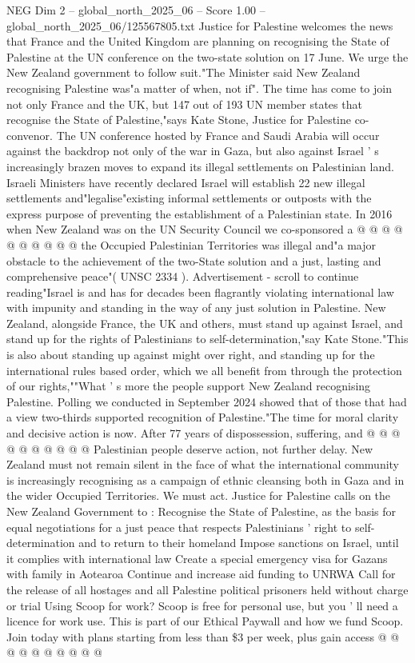 \begin{textsample}{NEG Dim 2 – global\_north\_2025\_06 – Score 1.00 – global\_north\_2025\_06/125567805.txt}  \label{ex:f2_neg_090}
Justice for Palestine welcomes the news that France and the United Kingdom are planning on recognising the State of Palestine at the UN conference on the two-state solution on 17 June.
We urge the New Zealand government to follow suit."The Minister said New Zealand recognising Palestine was"a matter of when, not if".
The time has come to join not only France and the UK, but 147 out of 193 UN member states that recognise the State of Palestine,"says Kate Stone, Justice for Palestine co-convenor.
The UN conference hosted by France and Saudi Arabia will occur against the backdrop not only of the war in Gaza, but also against Israel ' s increasingly brazen moves to expand its illegal settlements on Palestinian land.
Israeli Ministers have recently declared Israel will establish 22 new illegal settlements and"legalise"existing informal settlements or outposts with the express purpose of preventing the establishment of a Palestinian state.
In 2016 when New Zealand was on the UN Security Council we co-sponsored a @ @ @ @ @ @ @ @ @ @ the Occupied Palestinian Territories was illegal and"a major obstacle to the achievement of the two-State solution and a just, lasting and comprehensive peace"( UNSC 2334 ).
Advertisement - scroll to continue reading"Israel is and has for decades been flagrantly violating international law with impunity and standing in the way of any just solution in Palestine.
New Zealand, alongside France, the UK and others, must stand up against Israel, and stand up for the rights of Palestinians to self-determination,"say Kate Stone."This is also about standing up against might over right, and standing up for the international rules based order, which we all benefit from through the protection of our rights,""What ' s more the people support New Zealand recognising Palestine.
Polling we conducted in September 2024 showed that of those that had a view two-thirds supported recognition of Palestine."The time for moral clarity and decisive action is now.
After 77 years of dispossession, suffering, and @ @ @ @ @ @ @ @ @ @ Palestinian people deserve action, not further delay.
New Zealand must not remain silent in the face of what the international community is increasingly recognising as a campaign of ethnic cleansing both in Gaza and in the wider Occupied Territories.
We must act.
Justice for Palestine calls on the New Zealand Government to : Recognise the State of Palestine, as the basis for equal negotiations for a just peace that respects Palestinians ' right to self-determination and to return to their homeland Impose sanctions on Israel, until it complies with international law Create a special emergency visa for Gazans with family in Aotearoa Continue and increase aid funding to UNRWA Call for the release of all hostages and all Palestine political prisoners held without charge or trial Using Scoop for work?
Scoop is free for personal use, but you ' ll need a licence for work use.
This is part of our Ethical Paywall and how we fund Scoop.
Join today with plans starting from less than \$3 per week, plus gain access @ @ @ @ @ @ @ @ @ @

\end{textsample}

